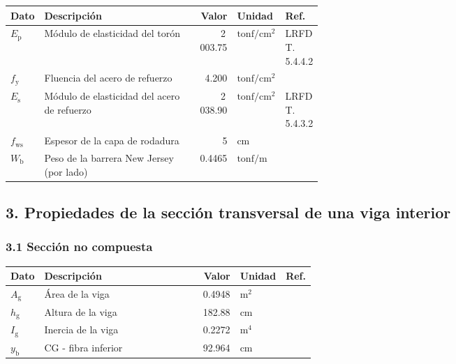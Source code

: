 \documentclass[10pt,a4paper]{article}
\begin{document}
\begin{longtable}{@{}l p{0.52\linewidth} r l l@{}}
\toprule
\textbf{Dato} & \textbf{Descripción} & \textbf{Valor} & \textbf{Unidad} & \textbf{Ref.}\\
\midrule
$E_{\mathrm{p}}$ & Módulo de elasticidad del torón & \cellcolor{fondodato}2\,003.75 & $\mathrm{tonf/cm^{2}}$ & {\scriptsize LRFD T. 5.4.4.2} \\
$f_{\mathrm{y}}$ & Fluencia del acero de refuerzo & \cellcolor{fondodato}4.200 & $\mathrm{tonf/cm^{2}}$ & {\scriptsize } \\
$E_{\mathrm{s}}$ & Módulo de elasticidad del acero de refuerzo & \cellcolor{fondodato}2\,038.90 & $\mathrm{tonf/cm^{2}}$ & {\scriptsize LRFD T. 5.4.3.2} \\
$f_{\mathrm{ws}}$ & Espesor de la capa de rodadura & \cellcolor{fondodato}5 & $\mathrm{cm}$ & {\scriptsize } \\
$W_{\mathrm{b}}$ & Peso de la barrera New Jersey (por lado) & \cellcolor{fondodato}0.4465 & $\mathrm{tonf/m}$ & {\scriptsize } \\
\bottomrule
\end{longtable}

\subsection{3. Propiedades de la sección transversal de una viga interior}

\subsubsection{3.1 Sección no compuesta}

\begin{longtable}{@{}l p{0.52\linewidth} r l l@{}}
\toprule
\textbf{Dato} & \textbf{Descripción} & \textbf{Valor} & \textbf{Unidad} & \textbf{Ref.}\\
\midrule
$A_{\mathrm{g}}$ & Área de la viga & \cellcolor{fondodato}0.4948 & $\mathrm{m^{2}}$ & {\scriptsize } \\
$h_{\mathrm{g}}$ & Altura de la viga & \cellcolor{fondodato}182.88 & $\mathrm{cm}$ & {\scriptsize } \\
$I_{\mathrm{g}}$ & Inercia de la viga & \cellcolor{fondodato}0.2272 & $\mathrm{m^{4}}$ & {\scriptsize } \\
$y_{\mathrm{b}}$ & CG - fibra inferior & \cellcolor{fondodato}92.964 & $\mathrm{cm}$ & {\scriptsize } \\
\bottomrule
\end{longtable}
\end{document}
